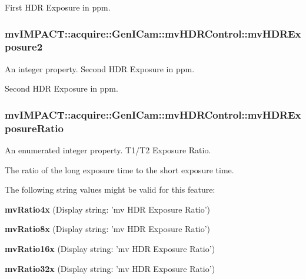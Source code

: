 First H\+D\+R Exposure in ppm. \hypertarget{classmv_i_m_p_a_c_t_1_1acquire_1_1_gen_i_cam_1_1mv_h_d_r_control_a97353e6296a61303ca64ff9ce8fda3e9}{
\subsubsection[{mv\+H\+D\+R\+Exposure2}]{ mv\+I\+M\+P\+A\+C\+T\+::acquire\+::\+Gen\+I\+Cam\+::mv\+H\+D\+R\+Control\+::mv\+H\+D\+R\+Exposure2}}\label{classmv_i_m_p_a_c_t_1_1acquire_1_1_gen_i_cam_1_1mv_h_d_r_control_a97353e6296a61303ca64ff9ce8fda3e9}


An integer property. Second H\+D\+R Exposure in ppm. 

Second H\+D\+R Exposure in ppm. \hypertarget{classmv_i_m_p_a_c_t_1_1acquire_1_1_gen_i_cam_1_1mv_h_d_r_control_a88c75307ed2be02b283ad488a94a7c3c}{
\subsubsection[{mv\+H\+D\+R\+Exposure\+Ratio}]{ mv\+I\+M\+P\+A\+C\+T\+::acquire\+::\+Gen\+I\+Cam\+::mv\+H\+D\+R\+Control\+::mv\+H\+D\+R\+Exposure\+Ratio}}\label{classmv_i_m_p_a_c_t_1_1acquire_1_1_gen_i_cam_1_1mv_h_d_r_control_a88c75307ed2be02b283ad488a94a7c3c}


An enumerated integer property. T1/\+T2 Exposure Ratio. 

The ratio of the long exposure time to the short exposure time.

The following string values might be valid for this feature\+:
\begin{DoxyItemize}
\item {\bfseries mv\+Ratio4x} (Display string\+: 'mv H\+D\+R Exposure Ratio')
\item {\bfseries mv\+Ratio8x} (Display string\+: 'mv H\+D\+R Exposure Ratio')
\item {\bfseries mv\+Ratio16x} (Display string\+: 'mv H\+D\+R Exposure Ratio')
\item {\bfseries mv\+Ratio32x} (Display string\+: 'mv H\+D\+R Exposure Ratio')
\end{DoxyItemize}

